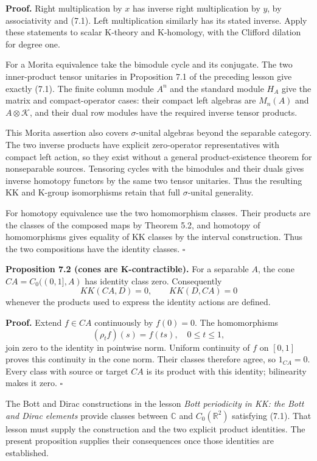 \documentclass[
  11pt,
]{article}
\begin{document}
\textbf{Proof.} Right multiplication by \(x\) has inverse right
multiplication by \(y\), by associativity and (7.1). Left multiplication
similarly has its stated inverse. Apply these statements to scalar
K-theory and K-homology, with the Clifford dilation for degree one.

For a Morita equivalence take the bimodule cycle and its conjugate. The
two inner-product tensor unitaries in Proposition 7.1 of the preceding
lesson give exactly (7.1). The finite column module \(A^n\) and the
standard module \(H_A\) give the matrix and compact-operator cases:
their compact left algebras are \(M_n(A)\) and \(A\otimes\mathcal K\),
and their dual row modules have the required inverse tensor products.

This Morita assertion also covers \(\sigma\)-unital algebras beyond the
separable category. The two inverse products have explicit zero-operator
representatives with compact left action, so they exist without a
general product-existence theorem for nonseparable sources. Tensoring
cycles with the bimodules and their duals gives inverse homotopy
functors by the same two tensor unitaries. Thus the resulting KK and
K-group isomorphisms retain that full \(\sigma\)-unital generality.

For homotopy equivalence use the two homomorphism classes. Their
products are the classes of the composed maps by Theorem 5.2, and
homotopy of homomorphisms gives equality of KK classes by the interval
construction. Thus the two compositions have the identity classes.
\(\square\)

\textbf{Proposition 7.2 (cones are K-contractible).} For a separable
\(A\), the cone \(CA=C_0((0,1],A)\) has identity class zero.
Consequently \[
KK(CA,D)=0,\qquad KK(D,CA)=0
\] whenever the products used to express the identity actions are
defined.

\textbf{Proof.} Extend \(f\in CA\) continuously by \(f(0)=0\). The
homomorphisms \[
(\rho_t f)(s)=f(ts),\quad0\leq t\leq1,
\] join zero to the identity in pointwise norm. Uniform continuity of
\(f\) on \([0,1]\) proves this continuity in the cone norm. Their
classes therefore agree, so \(1_{CA}=0\). Every class with source or
target \(CA\) is its product with this identity; bilinearity makes it
zero. \(\square\)

The Bott and Dirac constructions in the lesson \emph{Bott periodicity in
KK: the Bott and Dirac elements} provide classes between \(\mathbb C\)
and \(C_0(\mathbb R^2)\) satisfying (7.1). That lesson must supply the
construction and the two explicit product identities. The present
proposition supplies their consequences once those identities are
established.
\end{document}
